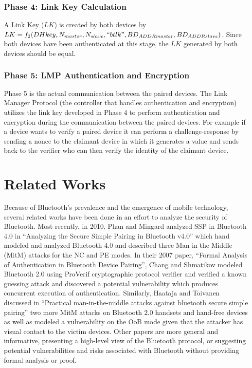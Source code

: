 \documentclass{acm_proc_article-sp}
\begin{document}
\subsubsection{Phase 4: Link Key Calculation}
A Link Key ($LK$) is created by both devices by $LK = f_2(DHkey, N_{master}, N_{slave}, ``btlk", BD_{ADDRmaster}, BD_{ADDRslave} )$. Since both devices have been authenticated at this stage, the $LK$ generated by both devices should be equal.

\subsubsection{Phase 5: LMP Authentication and Encryption}
Phase 5 is the actual communication between the paired devices. The Link Manager Protocol (the controller that handles authentication and encryption) utilizes the link key developed in Phase 4 to perform authentication and encryption during the communication between the paired devices. For example if a device wants to verify a paired device it can perform a challenge-response by sending a nonce to the claimant device in which it generates a value and sends back to the verifier who can then verify the identity of the claimant device.

\section{Related Works}


Because of Bluetooth's prevalence and the emergence of mobile technology, several related works have been done in an effort to analyze the security of Bluetooth. Most recently, in 2010, Phan and Mingard \cite{phan:mingard} analyzed SSP in Bluetooth 4.0 in ``Analyzing the Secure Simple Pairing in Bluetooth v4.0'' which hand modeled and analyzed Bluetooth 4.0 and described three Man in the Middle (MitM) attacks for the NC and PE modes. In their 2007 paper, ``Formal Analysis of Authentication in Bluetooth Device Pairing'', Chang and Shmatikov \cite{chang:shmatikov} modeled Bluetooth 2.0 using ProVerif cryptographic protocol verifier and verified a known guessing attack and discovered a potential vulnerability which produces concurrent execution of authentication. Similarly, Haataja and Toivanen \cite{haataja:toivanen} discussed in ``Practical man-in-the-middle attacks against bluetooth secure simple pairing'' two more MitM attacks on Bluetooth 2.0 handsets and hand-free devices as well as modeled a vulnerability on the OoB mode given that the attacker has visual contact to the victim devices. Other papers are more general and informative, presenting a high-level view of the Bluetooth protocol, or suggesting potential vulnerabilities and risks associated with Bluetooth without providing formal analysis or proof.
\end{document}
